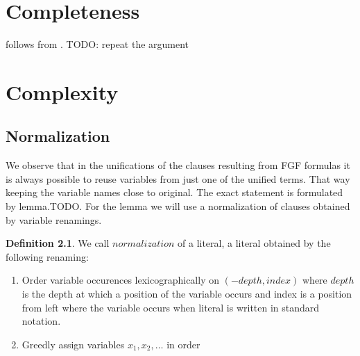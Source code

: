 \documentclass[english, shortabstract]{iithesis}
\theoremstyle{definition} \newtheorem{definition}{Definition}[chapter]
\theoremstyle{remark} \newtheorem{remark}[definition]{Observation}
\theoremstyle{plain} \newtheorem{theorem}[definition]{Theorem}
\theoremstyle{plain} \newtheorem{lemma}[definition]{Lemma}
\begin{document}


    

\chapter{Completeness}

follows from \cite{resolution gf}. TODO: repeat the argument

\chapter{Complexity}

\section{Normalization}
We observe that in the unifications of the clauses resulting from FGF formulas it is always possible to reuse variables from just one of the unified terms.
That way keeping the variable names close to original. The exact statement is formulated by lemma.TODO. 
For the lemma we will use a normalization of clauses obtained by variable renamings.

\begin{definition}
We call $normalization$ of a literal, a literal obtained by the following renaming:
\begin{enumerate}
    \item Order variable occurences lexicographically on $(-depth, index)$ 
    where $depth$ is the depth at which a position of the variable occurs and index is a position from left where the variable occurs when literal is written in standard notation.
    \item Greedly assign variables $x_1, x_2, \dots$ in order
\end{enumerate}
\end{definition}
\end{document}
